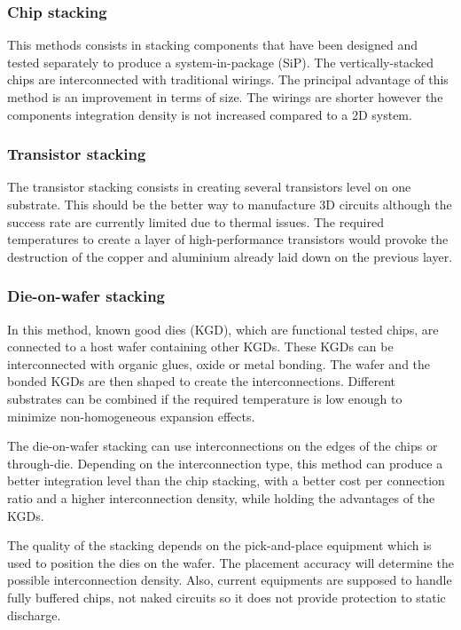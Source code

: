 \subsubsection{Chip stacking}

This methods consists in stacking components that have been designed and tested separately to produce a system-in-package (SiP). The vertically-stacked chips are interconnected with traditional wirings. The principal advantage of this method is an improvement in terms of size. The wirings are shorter however the components integration density is not increased compared to a 2D system.

\subsubsection{Transistor stacking}

The transistor stacking consists in creating several transistors level on one substrate. This should be the better way to manufacture 3D circuits although the success rate are currently limited due to thermal issues. The required temperatures to create a layer of high-performance transistors would provoke the destruction of the copper and aluminium already laid down on the previous layer.

\subsubsection{Die-on-wafer stacking}

In this method, known good dies (KGD), which are functional tested chips, are connected to a host wafer containing other KGDs. These KGDs can be interconnected with organic glues, oxide or metal bonding. The wafer and the bonded KGDs are then shaped to create the interconnections. Different substrates can be combined if the required temperature is low enough to minimize non-homogeneous expansion effects.

The die-on-wafer stacking can use interconnections on the edges of the chips or through-die. Depending on the interconnection type, this method can produce a better integration level than the chip stacking, with a better cost per connection ratio and a higher interconnection density, while holding the advantages of the KGDs.

The quality of the stacking depends on the pick-and-place equipment which is used to position the dies on the wafer. The placement accuracy will determine the possible interconnection density. Also, current equipments are supposed to handle fully buffered chips, not naked circuits so it does not provide protection to static discharge. 

